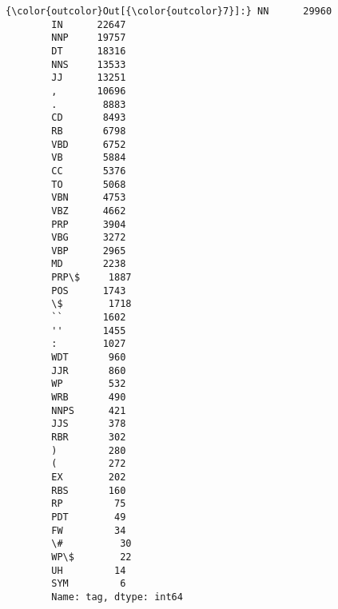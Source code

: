 \documentclass[11pt]{article}
\begin{document}
\begin{Verbatim}[commandchars=\\\{\}]
{\color{outcolor}Out[{\color{outcolor}7}]:} NN      29960
        IN      22647
        NNP     19757
        DT      18316
        NNS     13533
        JJ      13251
        ,       10696
        .        8883
        CD       8493
        RB       6798
        VBD      6752
        VB       5884
        CC       5376
        TO       5068
        VBN      4753
        VBZ      4662
        PRP      3904
        VBG      3272
        VBP      2965
        MD       2238
        PRP\$     1887
        POS      1743
        \$        1718
        ``       1602
        ''       1455
        :        1027
        WDT       960
        JJR       860
        WP        532
        WRB       490
        NNPS      421
        JJS       378
        RBR       302
        )         280
        (         272
        EX        202
        RBS       160
        RP         75
        PDT        49
        FW         34
        \#          30
        WP\$        22
        UH         14
        SYM         6
        Name: tag, dtype: int64
\end{Verbatim}
            

    
    
    
    
\end{document}
